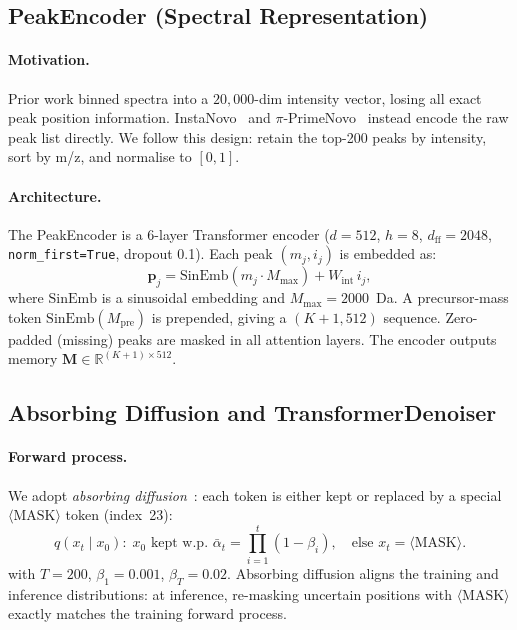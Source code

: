 \documentclass[11pt]{article}
\begin{document}
\subsection{PeakEncoder (Spectral Representation)}

\paragraph{Motivation.}
Prior work binned spectra into a $20{,}000$-dim intensity vector, losing all exact
peak position information. InstaNovo~\cite{instanovo} and $\pi$-PrimeNovo~\cite{primenovo}
instead encode the raw peak list directly. We follow this design: retain the top-200
peaks by intensity, sort by m/z, and normalise to $[0,1]$.

\paragraph{Architecture.}
The PeakEncoder is a $6$-layer Transformer encoder ($d=512$, $h=8$, $d_\text{ff}=2048$,
\texttt{norm\_first=True}, dropout 0.1). Each peak $(m_j, i_j)$ is embedded as:
\begin{equation}
  \mathbf{p}_j = \mathrm{SinEmb}(m_j \cdot M_\text{max}) + W_\text{int}\,i_j,
\end{equation}
where $\mathrm{SinEmb}$ is a sinusoidal embedding and $M_\text{max}=2000$~Da.
A precursor-mass token $\mathrm{SinEmb}(M_\text{pre})$ is prepended, giving a
$(K{+}1, 512)$ sequence. Zero-padded (missing) peaks are masked in all attention layers.
The encoder outputs memory $\mathbf{M} \in \mathbb{R}^{(K+1)\times 512}$.

\subsection{Absorbing Diffusion and TransformerDenoiser}

\paragraph{Forward process.}
We adopt \emph{absorbing diffusion}~\cite{d3pm}: each token is either kept or
replaced by a special $\langle\text{MASK}\rangle$ token (index~23):
\begin{equation}
  q(x_t \mid x_0):\; x_0 \text{ kept w.p. } \bar\alpha_t =
  \prod_{i=1}^{t}(1-\beta_i),\quad \text{else } x_t = \langle\text{MASK}\rangle.
\end{equation}
with $T=200$, $\beta_1=0.001$, $\beta_T=0.02$. Absorbing diffusion aligns the
training and inference distributions: at inference, re-masking uncertain positions
with $\langle\text{MASK}\rangle$ exactly matches the training forward process.
\end{document}
